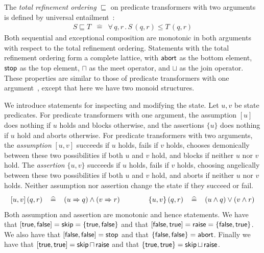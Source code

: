 \documentclass[submission,copyright,creativecommons]{eptcs}
\newcommand{\KW}[1]{\mathop{\sf #1}}
\newcommand{\TRUE}{\KW{true}}
\newcommand{\FALSE}{\KW{false}}
\newcommand{\ABORT}{\KW{abort}}
\newcommand{\SKIP}{\KW{skip}}
\newcommand{\RAISE}{\KW{raise}}
\newcommand{\STOP}{\KW{stop}}
\newcommand{\meet}{\sqcap}
\newcommand{\join}{\sqcup}
\newcommand{\con}{\wedge}
\newcommand{\dis}{\vee}
\newcommand{\imp}{\Rightarrow}
\renewcommand{\dot}{\mathop{.}}
\newcommand{\defeq}{\left.\widehat{=}\right.}
\newcommand{\refby}{\sqsubseteq}
\begin{document}
The {\em total refinement ordering} $\refby$ on predicate transformers with two arguments is defined by universal entailment~\cite{KingMorgan95ExitsInRefinementCalculus}:
\[\renewcommand{\arraystretch}{1.2}\begin{array}{rcl}
  S \refby T & \defeq & \forall\, q, r \dot S\,(q, r) \leq T\,(q, r)
\end{array}\]
Both sequential and exceptional composition are monotonic in both arguments with respect to the total refinement ordering. Statements with the total refinement ordering form a complete lattice, with $\ABORT$ as the bottom element, $\STOP$ as the top element, $\meet$ as the meet operator, and $\join$ as the join operator. These properties are similar to those of predicate transformers with one argument~\cite{BackVonWright98RefinementCalculus}, except that here we have two monoid structures.

We introduce statements for inspecting and modifying the state. Let $u,v$ be state predicates. For predicate transformers with one argument, the assumption $[u]$  does nothing if $u$ holds and blocks otherwise, and the assertions $\{u\}$ does nothing if $u$ hold and aborts otherwise. For predicate transformers with two arguments, the {\em assumption} $[u, v]$ succeeds if $u$ holds, fails if $v$ holds, chooses demonically between these two possibilities if both $u$ and $v$ hold, and blocks if neither $u$ nor $v$ hold. The {\em assertion} $\{u, v\}$ succeeds if $u$ holds, fails if $v$ holds, choosing angelically between these two possibilities if both $u$ and $v$ hold, and aborts if neither $u$ nor $v$ holds. Neither assumption nor assertion change the state if they succeed or fail.
\[\renewcommand{\arraystretch}{1.2}\begin{array}{rcl@{\qquad\qquad}rcl}
   [u, v]\,(q, r) & \defeq & (u \imp q) \con (v \imp r) & \{u, v\}\,(q, r) & \defeq & (u \con q) \dis (v \con r)
\end{array}\]
Both assumption and assertion are monotonic and hence statements. We have that $[\TRUE, \FALSE] = \SKIP = \{\TRUE, \FALSE\}$ and that $[\FALSE, \TRUE] = \RAISE = \{\FALSE, \TRUE\}$. We also have that $[\FALSE, \FALSE] = \STOP$ and that $\{\FALSE, \FALSE\} = \ABORT$. Finally we have that $[\TRUE, \TRUE] = \SKIP \meet \RAISE$ and that $\{\TRUE, \TRUE\} = \SKIP \join \RAISE$.
\end{document}
